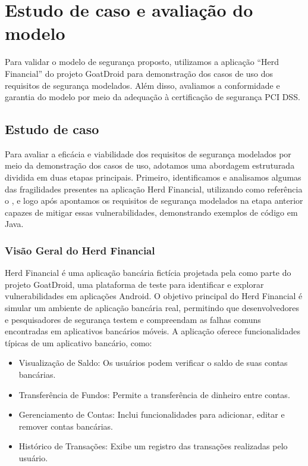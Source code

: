 
    \chapter{Estudo de caso e avaliação do modelo}
    Para validar o modelo de segurança proposto, utilizamos a aplicação ``Herd Financial'' do projeto GoatDroid para demonstração dos casos de uso dos requisitos de segurança modelados. Além disso, avaliamos a conformidade e garantia do modelo por meio da adequação à certificação de segurança PCI DSS.

    \section{Estudo de caso}
    Para avaliar a eficácia e viabilidade dos requisitos de segurança modelados por meio da demonstração dos casos de uso, adotamos uma abordagem estruturada dividida em duas etapas principais. Primeiro, identificamos e analisamos algumas das fragilidades presentes na aplicação Herd Financial, utilizando como referência o , e logo após apontamos os requisitos de segurança modelados na etapa anterior capazes de mitigar essas vulnerabilidades, demonstrando exemplos de código em Java.


    \subsection{Visão Geral do Herd Financial}
    
    Herd Financial é uma aplicação bancária fictícia projetada pela  como parte do projeto GoatDroid, uma plataforma de teste para identificar e explorar vulnerabilidades em aplicações Android. O objetivo principal do Herd Financial é simular um ambiente de aplicação bancária real, permitindo que desenvolvedores e pesquisadores de segurança testem e compreendam as falhas comuns encontradas em aplicativos bancários móveis. A aplicação oferece funcionalidades típicas de um aplicativo bancário, como:

    \begin{itemize}[topsep=3pt, partopsep=3pt, itemsep=3pt, parsep=3pt]
        \item Visualização de Saldo: Os usuários podem verificar o saldo de suas contas bancárias.
        \item Transferência de Fundos: Permite a transferência de dinheiro entre contas.
        \item Gerenciamento de Contas: Inclui funcionalidades para adicionar, editar e remover contas bancárias.
        \item Histórico de Transações: Exibe um registro das transações realizadas pelo usuário.
    \end{itemize}

